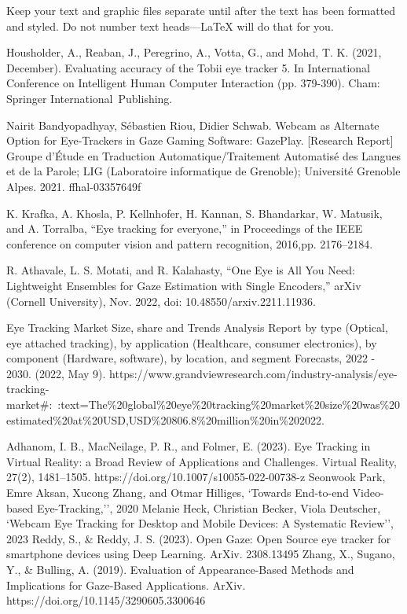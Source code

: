 \documentclass[conference]{IEEEtran}
\begin{document}
Keep your text and graphic files separate until after the text has been 
formatted and styled. Do not number text heads---{\LaTeX} will do that 
for you.

\begin{thebibliography}{00}

Housholder, A., Reaban, J., Peregrino, A., Votta, G., and Mohd, T. K. (2021, December). Evaluating accuracy of the Tobii eye tracker 5. In International Conference on Intelligent Human Computer Interaction (pp. 379-390). Cham: Springer International Publishing.

Nairit Bandyopadhyay, Sébastien Riou, Didier Schwab. Webcam as Alternate Option for Eye-Trackers
in Gaze Gaming Software: GazePlay. [Research Report] Groupe d’Étude en Traduction Automatique/Traitement Automatisé des Langues et de la Parole; LIG (Laboratoire informatique de Grenoble); Université Grenoble Alpes. 2021. ffhal-03357649f

K. Krafka, A. Khosla, P. Kellnhofer, H. Kannan, S. Bhandarkar, W. Matusik, and A. Torralba, “Eye tracking for everyone,” in Proceedings of the IEEE conference on computer vision and pattern recognition, 2016,pp. 2176–2184.

R. Athavale, L. S. Motati, and R. Kalahasty, “One Eye is All You Need: Lightweight Ensembles for Gaze Estimation with  Single Encoders,” arXiv (Cornell University), Nov. 2022, doi: 10.48550/arxiv.2211.11936.


Eye Tracking Market Size, share and Trends Analysis Report by type (Optical, eye attached tracking), by application (Healthcare, consumer electronics), by component (Hardware, software), by location, and segment Forecasts, 2022 - 2030. (2022, May 9). https://www.grandviewresearch.com/industry-analysis/eye-tracking-market\#:~:text=The\%20global\%20eye\%20tracking\%20market\%20size\%20was\%20estimated\%20at\%20USD,USD\%20806.8\%20million\%20in\%202022.

Adhanom, I. B., MacNeilage, P. R., and Folmer, E. (2023). Eye Tracking in Virtual Reality: a Broad Review of Applications and Challenges. Virtual Reality, 27(2), 1481–1505. https://doi.org/10.1007/s10055-022-00738-z
 Seonwook Park, Emre Aksan, Xucong Zhang, and Otmar Hilliges, `Towards End-to-end Video-based Eye-Tracking,'', 2020 
 Melanie Heck, Christian Becker, Viola Deutscher, `Webcam Eye Tracking for Desktop and Mobile Devices: A Systematic Review'', 2023
Reddy, S., \& Reddy, J. S. (2023). Open Gaze: Open Source eye tracker for smartphone devices using Deep Learning. ArXiv. 2308.13495
 Zhang, X., Sugano, Y., \& Bulling, A. (2019). Evaluation of Appearance-Based Methods and Implications for Gaze-Based Applications. ArXiv. https://doi.org/10.1145/3290605.3300646


\end{thebibliography}
\end{document}
